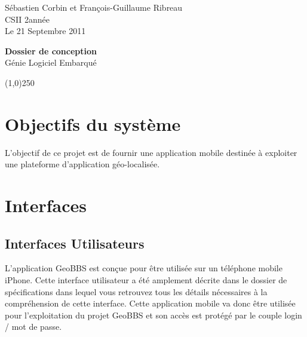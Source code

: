 \documentclass[a4paper,12pt]{report}
\begin{document}
  \begin{onehalfspace}

    \begin{titlepage}
    \setcounter{page}{0}
      \begin{center}
        Sébastien Corbin et François-Guillaume Ribreau\\
        CSII 2\ieme année\\
        Le 21 Septembre 2011\\
      \end{center}
      \hrulefill
      \vspace{7cm}
      \begin{center}
        \LARGE \textbf{Dossier de conception}\\
        \vspace{3cm}
        \normalsize Génie Logiciel Embarqué
      \end{center}

      \vspace{9,5cm}

      \begin{center}
      \line(1,0){250}
      \end{center}

      \begin{center}
      \tiny{\currfilename}
      \end{center}
      
    \end{titlepage}

\chapter{Objectifs du système}
L'objectif de ce projet est de fournir une application mobile destinée à exploiter une plateforme d'application géo-localisée.

\chapter{Interfaces}
\section{Interfaces Utilisateurs}
L'application GeoBBS est conçue pour être utilisée sur un téléphone mobile iPhone.
Cette interface utilisateur a été amplement décrite dans le dossier de spécifications dans lequel vous retrouvez tous les détails nécessaires à la compréhension de cette interface.
Cette application mobile va donc être utilisée pour l'exploitation du projet GeoBBS et son accès est protégé par le couple login / mot de passe.


\end{onehalfspace}
\end{document}
